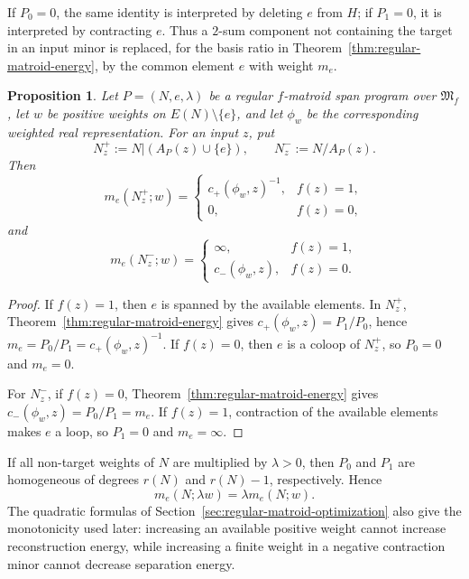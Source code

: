 \documentclass[11pt]{article}
\numberwithin{equation}{section}
\newtheorem{proposition}[definition]{Proposition}
\theoremstyle{remark}
\begin{document}
If $P_0=0$, the same identity is interpreted by deleting $e$ from $H$; if
$P_1=0$, it is interpreted by contracting $e$. Thus a $2$-sum component not containing the target
in an input minor is replaced, for the basis ratio in
Theorem~\ref{thm:regular-matroid-energy}, by the common element $e$ with
weight $m_e$.


\begin{proposition}
\label{prop:seymour-two-sum-input-minors}
Let $P=(N,e,\lambda)$ be a regular $f$-matroid span program over
$\mathfrak M_f$, let $w$ be positive weights on
$E(N)\setminus\{e\}$, and let $\phi_w$ be the corresponding weighted real
representation. For an input $z$, put
\[
    N_z^+:=N|(A_P(z)\cup\{e\}),
    \qquad
    N_z^-:=N/A_P(z).
\]
Then
\begin{equation}
    m_e(N_z^+;w)
    =
    \begin{cases}
        c_+(\phi_w,z)^{-1}, & f(z)=1,\\
        0, & f(z)=0,
    \end{cases}
    \label{eq:two-sum-positive-input-value}
\end{equation}
and
\begin{equation}
    m_e(N_z^-;w)
    =
    \begin{cases}
        \infty, & f(z)=1,\\
        c_-(\phi_w,z), & f(z)=0.
    \end{cases}
    \label{eq:two-sum-negative-input-value}
\end{equation}
\end{proposition}

\begin{proof}
If $f(z)=1$, then $e$ is spanned by the available elements. In $N_z^+$,
Theorem~\ref{thm:regular-matroid-energy} gives
$c_+(\phi_w,z)=P_1/P_0$, hence $m_e=P_0/P_1=c_+(\phi_w,z)^{-1}$.
If $f(z)=0$, then $e$ is a coloop of $N_z^+$, so $P_0=0$ and $m_e=0$.

For $N_z^-$, if $f(z)=0$, Theorem~\ref{thm:regular-matroid-energy} gives
$c_-(\phi_w,z)=P_0/P_1=m_e$. If $f(z)=1$, contraction of the available elements
makes $e$ a loop, so $P_1=0$ and $m_e=\infty$.
\end{proof}

If all non-target weights of $N$ are multiplied by $\lambda>0$, then
$P_0$ and $P_1$ are homogeneous of degrees $r(N)$ and $r(N)-1$,
respectively. Hence
\begin{equation}
    m_e(N;\lambda w)=\lambda m_e(N;w).
    \label{eq:two-sum-homogeneity}
\end{equation}
The quadratic formulas of Section~\ref{sec:regular-matroid-optimization}
also give the monotonicity used later: increasing an available positive
weight cannot increase reconstruction energy, while increasing a finite
weight in a negative contraction minor cannot decrease separation energy.
\end{document}
